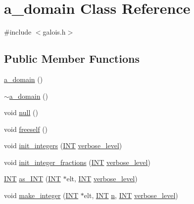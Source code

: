 \hypertarget{classa__domain}{}\section{a\+\_\+domain Class Reference}
\label{classa__domain}


{\ttfamily \#include $<$galois.\+h$>$}

\subsection*{Public Member Functions}
\begin{DoxyCompactItemize}
\item 
\mbox{\hyperlink{classa__domain_ac200ef828b9d0c3afd9d48a6c18adc95}{a\+\_\+domain}} ()
\item 
\mbox{\hyperlink{classa__domain_ab4aa2109781732d1c606c30c9f987016}{$\sim$a\+\_\+domain}} ()
\item 
void \mbox{\hyperlink{classa__domain_ae71217e1effae4133049e384af04985b}{null}} ()
\item 
void \mbox{\hyperlink{classa__domain_ab49f441e3ebbd34eed84e72c418adc1f}{freeself}} ()
\item 
void \mbox{\hyperlink{classa__domain_acfabbad9b7871cff00c17d0e289b4ddd}{init\+\_\+integers}} (\mbox{\hyperlink{galois_8h_a09fddde158a3a20bd2dcadb609de11dc}{I\+NT}} \mbox{\hyperlink{simeon_8_c_a818073fbcc2f439e7c56952f67386122}{verbose\+\_\+level}})
\item 
void \mbox{\hyperlink{classa__domain_a78ac7c303c06cd4337514fd7e02838e2}{init\+\_\+integer\+\_\+fractions}} (\mbox{\hyperlink{galois_8h_a09fddde158a3a20bd2dcadb609de11dc}{I\+NT}} \mbox{\hyperlink{simeon_8_c_a818073fbcc2f439e7c56952f67386122}{verbose\+\_\+level}})
\item 
\mbox{\hyperlink{galois_8h_a09fddde158a3a20bd2dcadb609de11dc}{I\+NT}} \mbox{\hyperlink{classa__domain_ac7988cb523f4a5d141f066c9e78a59a8}{as\+\_\+\+I\+NT}} (\mbox{\hyperlink{galois_8h_a09fddde158a3a20bd2dcadb609de11dc}{I\+NT}} $\ast$elt, \mbox{\hyperlink{galois_8h_a09fddde158a3a20bd2dcadb609de11dc}{I\+NT}} \mbox{\hyperlink{simeon_8_c_a818073fbcc2f439e7c56952f67386122}{verbose\+\_\+level}})
\item 
void \mbox{\hyperlink{classa__domain_aa2df348536ab3b2a701a9bf287c2f248}{make\+\_\+integer}} (\mbox{\hyperlink{galois_8h_a09fddde158a3a20bd2dcadb609de11dc}{I\+NT}} $\ast$elt, \mbox{\hyperlink{galois_8h_a09fddde158a3a20bd2dcadb609de11dc}{I\+NT}} \mbox{\hyperlink{simeon_8_c_a7f2cd26777ce0ff3fdaf8d02aacbddfb}{n}}, \mbox{\hyperlink{galois_8h_a09fddde158a3a20bd2dcadb609de11dc}{I\+NT}} \mbox{\hyperlink{simeon_8_c_a818073fbcc2f439e7c56952f67386122}{verbose\+\_\+level}})

\end{DoxyCompactItemize}

